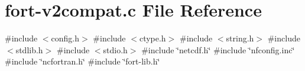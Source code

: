 \hypertarget{fort-v2compat_8c}{}\section{fort-\/v2compat.c File Reference}
\label{fort-v2compat_8c}
{\ttfamily \#include $<$config.\+h$>$}\newline
{\ttfamily \#include $<$ctype.\+h$>$}\newline
{\ttfamily \#include $<$string.\+h$>$}\newline
{\ttfamily \#include $<$stdlib.\+h$>$}\newline
{\ttfamily \#include $<$stdio.\+h$>$}\newline
{\ttfamily \#include \char`\"{}netcdf.\+h\char`\"{}}\newline
{\ttfamily \#include \char`\"{}nfconfig.\+inc\char`\"{}}\newline
{\ttfamily \#include \char`\"{}ncfortran.\+h\char`\"{}}\newline
{\ttfamily \#include \char`\"{}fort-\/lib.\+h\char`\"{}}\newline
